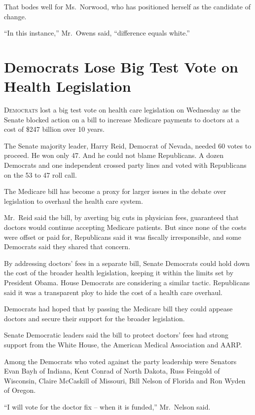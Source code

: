 ﻿\documentclass[12pt]{article}
\begin{document}
That bodes well for Ms.~Norwood, who has positioned herself as the candidate of change.

``In this instance,'' Mr.~Owens said, ``difference equals white.''

\section{Democrats Lose Big Test Vote on Health Legislation}

\lettrine{D}{emocrats} lost a big test vote on health care legislation on
Wednesday as the Senate blocked action on a bill to increase Medicare payments to doctors at a cost
of \$247 billion over 10 years.

The Senate majority leader, Harry Reid, Democrat of Nevada, needed 60 votes to proceed. He won only
47. And he could not blame Republicans. A dozen Democrats and one independent crossed party lines
and voted with Republicans on the 53 to 47 roll call.

The Medicare bill has become a proxy for larger issues in the debate over legislation to overhaul
the health care system.

Mr.~Reid said the bill, by averting big cuts in physician fees, guaranteed that doctors would
continue accepting Medicare patients. But since none of the costs were offset or paid for,
Republicans said it was fiscally irresponsible, and some Democrats said they shared that concern.

By addressing doctors' fees in a separate bill, Senate Democrats could hold down the cost of the
broader health legislation, keeping it within the limits set by President Obama. House Democrats are
considering a similar tactic. Republicans said it was a transparent ploy to hide the cost of a
health care overhaul.

Democrats had hoped that by passing the Medicare bill they could appease doctors and secure their
support for the broader legislation.

Senate Democratic leaders said the bill to protect doctors' fees had strong support from the White
House, the American Medical Association and AARP.

Among the Democrats who voted against the party leadership were Senators Evan Bayh of Indiana, Kent
Conrad of North Dakota, Russ Feingold of Wisconsin, Claire McCaskill of Missouri, Bill Nelson of
Florida and Ron Wyden of Oregon.

``I will vote for the doctor fix -- when it is funded,'' Mr.~Nelson said.
\end{document}
